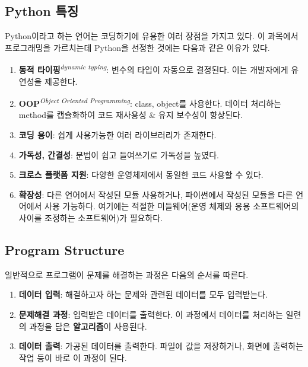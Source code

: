 \subsection{Python 특징}

Python이라고 하는 언어는 코딩하기에 유용한 여러 장점을 가지고 있다. 이 과목에서 프로그래밍을 가르치는데 Python을 선정한 것에는 다음과 같은 이유가 있다.

\begin{enumerate}
\def\labelenumi{\arabic{enumi}.}
    \item \textbf{동적 타이핑}\textit{\textsuperscript{dynamic typing}}: 변수의 타입이 자동으로 결정된다. 이는 개발자에게 유연성을 제공한다.
    \item \textbf{OOP}\textit{\textsuperscript{Object Oriented Programming}}: class, object를 사용한다. 데이터 처리하는 method를 캡슐화하여 코드 재사용성 \& 유지 보수성이 향상된다.
    \item \textbf{코딩 용이}: 쉽게 사용가능한 여러 라이브러리가 존재한다.
    \item \textbf{가독성, 간결성}: 문법이 쉽고 들여쓰기로 가독성을 높였다.
    \item \textbf{크로스 플랫폼 지원}: 다양한 운영체제에서 동일한 코드 사용할 수 있다.
    \item \textbf{확장성}: 다른 언어에서 작성된 모듈 사용하거나, 파이썬에서 작성된 모듈을 다른 언어에서 사용 가능하다. 여기에는 적절한 미들웨어(운영 체제와 응용 소프트웨어의 사이를 조정하는 소프트웨어)가 필요하다.
\end{enumerate}

\subsection{Program Structure}

일반적으로 프로그램이 문제를 해결하는 과정은 다음의 순서를 따른다.

\begin{enumerate}
\def\labelenumi{\arabic{enumi}.}
    \item \textbf{데이터 입력}: 해결하고자 하는 문제와 관련된 데이터를 모두 입력받는다.
    \item \textbf{문제해결 과정}: 입력받은 데이터를 출력한다. 이 과정에서 데이터를 처리하는 일련의 과정을 담은 \textbf{알고리즘}이 사용된다.
    \item \textbf{데이터 출력}: 가공된 데이터를 출력한다. 파일에 값을 저장하거나, 화면에 출력하는 작업 등이 바로 이 과정이 된다.
\end{enumerate}

